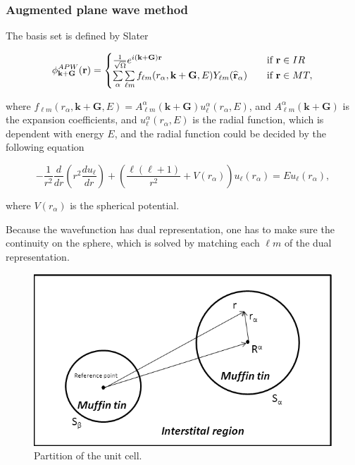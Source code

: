 \documentclass[a4paper, 12pt, titlepage,oneside,drop]{kthesis}
\begin{document}
\subsubsection{Augmented plane wave method}

The basis set is defined by Slater

\begin{equation}\label{ap111}
\phi^{APW}_{\textbf {k}+\textbf{G}} ({\textbf r}) = 
\begin{cases} \frac {1}{\sqrt{\Omega}} e^{i({ \textbf {k}+\textbf{G}}) {\textbf r}} & \quad \mbox{if ${\textbf r} \in IR $} 
\\
\sumg<\alpha>\sum\limits_{{\ell}m} f_{{\ell}{m}} (r_{\alpha},{\textbf {k}+\textbf{G}}, E) Y_{{\ell}m}(\widehat{{\textbf r}}_{\alpha})  & \quad \mbox{if $ {\textbf r} \in MT, $}\\ 
\end{cases}
\end{equation}

where $f_{{\ell}{m}} (r_{\alpha},\textbf{k}+\textbf{G} ,E) =  A _{{\ell}m}^{\alpha} ( \textbf {k}+\textbf{G}) u_{{\ell}}^{\alpha}(r_{\alpha}, E)$, and $A _{{\ell}m}^{\alpha} (\textbf {k}+\textbf{G}) $ is the expansion coefficients, and $u_{{\ell}}^{\alpha} (r_{\alpha}, E)$  is the radial function, which is dependent with energy $E$, and the
radial function could be decided by the following equation

\begin{equation}\label{ap2}
-\frac{1}{r^2}  \frac{d}{dr} (r^2 \frac{du_{\ell}}{dr})+ \left(\frac{\ell(\ell+1)}{r^2}+V(r_{\alpha})\right)u_{\ell}(r_{\alpha}) = E u_{\ell}(r_{\alpha}),
\end{equation}

where $V(r_{\alpha})$ is the spherical potential.

Because the wavefunction has dual representation, one has to make sure the continuity on the sphere, which is solved by matching each $\ell m$
of the dual representation.

\begin{figure}[h]
\begin{center}
\includegraphics[scale=0.7]{Presentation1.png}
\caption{Partition of the unit cell.}
\label{ucuc}
\end{center}
\end{figure}
\end{document}

